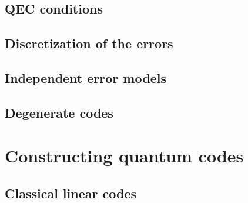 \subsection{QEC conditions}

\subsection{Discretization of the errors}

\subsection{Independent error models}

\subsection{Degenerate codes}


\section{Constructing quantum codes}
\subsection{Classical linear codes}


